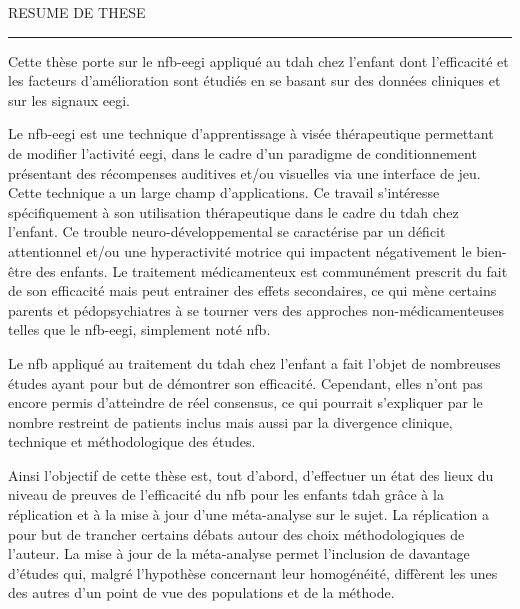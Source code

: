 
\begin{center}
\MakeUppercase{\LARGE{R}\Large{esume de these}} \\
\vspace{0mm}
\noindent\rule{16cm}{0.4pt}
\end{center}

Cette thèse porte sur le \gls{nfb}-\gls{eegi} appliqué au \gls{tdah} chez l'enfant dont l'efficacité et les 
facteurs d'amélioration sont étudiés en se basant sur des données cliniques et sur les signaux \gls{eegi}. 

Le \gls{nfb}-\gls{eegi} est une technique d'apprentissage à visée thérapeutique permettant de modifier l'activité \gls{eegi}, 
dans le cadre d'un paradigme de conditionnement présentant des récompenses auditives et/ou visuelles via une 
interface de jeu. Cette technique a un large champ d'applications. Ce travail s'intéresse spécifiquement à son utilisation
thérapeutique dans le cadre 
du \gls{tdah} chez l'enfant. Ce trouble neuro-développemental se caractérise par un déficit attentionnel et/ou une hyperactivité 
motrice qui impactent négativement le bien-être des enfants. Le traitement médicamenteux est communément prescrit du fait 
de son efficacité mais peut entrainer des effets secondaires, ce qui mène certains parents et pédopsychiatres à se tourner 
vers des approches non-médicamenteuses telles que le \gls{nfb}-\gls{eegi}, simplement noté \gls{nfb}.
 
Le \gls{nfb} appliqué au traitement du \gls{tdah} chez l'enfant a fait l'objet de nombreuses études ayant pour but de démontrer son efficacité. 
Cependant, elles n'ont pas encore permis d'atteindre de réel consensus, ce qui pourrait s'expliquer par le nombre restreint de patients inclus 
mais aussi par la divergence clinique, technique et méthodologique des études. 

Ainsi l'objectif de cette thèse est, tout d'abord, d'effectuer un état des lieux du niveau de preuves de l'efficacité 
du \gls{nfb} pour les enfants \gls{tdah} grâce à la réplication et à la mise à jour d'une méta-analyse sur le sujet. 
La réplication a pour but de trancher certains débats autour des choix méthodologiques de l'auteur. 
La mise à jour de la méta-analyse permet l'inclusion de davantage d'études qui, malgré l'hypothèse concernant leur homogénéité,
diffèrent les unes des autres d'un point de vue des populations et de la méthode.  

